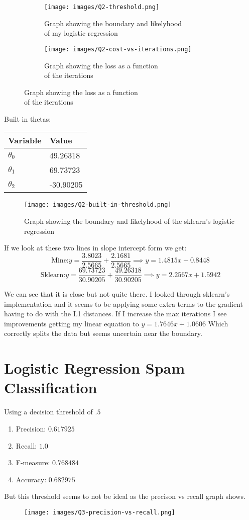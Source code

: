 \documentclass[12pt]{article}
\begin{document}
\begin{figure}[h]
\centering
\begin{subfigure}{.5\textwidth}
    \centering
    \texttt{[image: images/Q2-threshold.png]}
    \caption{Graph showing the boundary and likelyhood\\ of my logistic regression}
\end{subfigure}%
\begin{subfigure}{.5\textwidth}
    \centering
    \texttt{[image: images/Q2-cost-vs-iterations.png]}
    \caption{Graph showing the loss as a function\\ of the iterations}
\end{subfigure}
\end{figure}

Built in thetas:
\begin{tabular}{|l|l|}
\hline
Variable   & Value  \\
\hline
$\theta_0$ &  49.26318 \\
$\theta_1$ &  69.73723 \\
$\theta_2$ & -30.90205 \\
\hline
\end{tabular}

\begin{figure}[h]
    \centering
    \texttt{[image: images/Q2-built-in-threshold.png]}
    \caption{Graph showing the boundary and likelyhood of the sklearn's logistic regression}
\end{figure}
If we look at these two lines in slope intercept form we get:
$$ \text{Mine:} y = \frac{3.8023}{2.5665} + \frac{2.1681}{2.5665} \implies y = 1.4815x + 0.8448$$
$$ \text{Sklearn:} y = \frac{69.73723}{30.90205} + \frac{49.26318}{30.90205} \implies y = 2.2567x + 1.5942$$

We can see that it is close but not quite there.
I looked through sklearn's implementation and it seems to be applying some extra terms to the gradient having to do with the L1 distances.
If I increase the max iterations I see improvements getting my linear equation to $ y = 1.7646x + 1.0606$
Which correctly splits the data but seems uncertain near the boundary.

\newpage
\section{Logistic Regression Spam Classification}
Using a decision threshold of $.5$
\begin{enumerate}
    \item Precision: $0.617925$
    \item Recall:    $1.0$
    \item F-measure: $0.768484$
    \item Accuracy:  $0.682975$
\end{enumerate}
But this threshold seems to not be ideal as the precison vs recall graph shows.
\begin{figure}[h]
\centering
\texttt{[image: images/Q3-precision-vs-recall.png]}
\end{figure}
\end{document}
